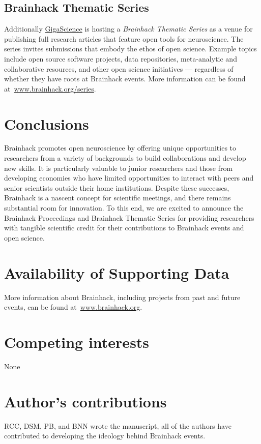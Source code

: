 \documentclass[11pt]{bmc_article_s50}
\begin{document}
\subsection{Brainhack Thematic Series}

Additionally \href{http://www.gigasciencejournal.com/}{GigaScience} is hosting a \emph{Brainhack Thematic Series} as a venue for publishing full research articles that feature open tools for neuroscience. The series invites submissions that embody the ethos of open science. Example topics include open source software projects, data repositories, meta-analytic and collaborative resources, and other open science initiatives --- regardless of whether they have roots at Brainhack events. More information can be found at~\href{http://brainhack.org/series/}{www.brainhack.org/series}.

\section{Conclusions}

Brainhack promotes open neuroscience by offering unique opportunities to researchers from a variety of backgrounds to build collaborations and develop new skills. It is particularly valuable to junior researchers and those from developing economies who have limited opportunities to interact with peers and senior scientists outside their home institutions. Despite these successes, Brainhack is a nascent concept for scientific meetings, and there remains substantial room for innovation. To this end, we are excited to announce the Brainhack Proceedings and Brainhack Thematic Series for providing researchers with tangible scientific credit for their contributions to Brainhack events and open science.


\newpage
\section*{Availability of Supporting Data}
More information about Brainhack, including projects from past and future events, can be found at~\href{http://www.brainhack.org}{www.brainhack.org}.

\section*{Competing interests}
None

\section*{Author's contributions}
RCC, DSM, PB, and BNN wrote the manuscript, all of the authors have contributed to developing the ideology behind Brainhack events.
\end{document}
